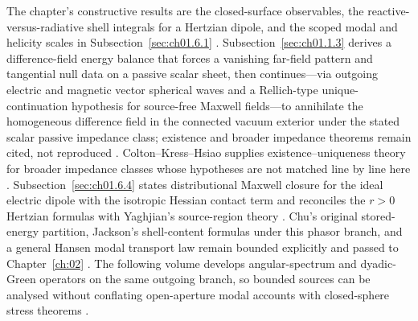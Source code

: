 The chapter's constructive results are the closed-surface observables, the reactive-versus-radiative shell integrals for a Hertzian dipole, and the scoped modal and helicity scales in Subsection~\ref{sec:ch01.6.1} \cite{stratton1941,harrington2001,chu1948}. Subsection~\ref{sec:ch01.1.3} derives a difference-field energy balance that forces a vanishing far-field pattern and tangential null data on a passive scalar sheet, then continues---via outgoing electric and magnetic vector spherical waves and a Rellich-type unique-continuation hypothesis for source-free Maxwell fields---to annihilate the homogeneous difference field in the connected vacuum exterior under the stated scalar passive impedance class; existence and broader impedance theorems remain cited, not reproduced \cite{sommerfeld1949,harrington2001}. Colton--Kress--Hsiao supplies existence--uniqueness theory for broader impedance classes whose hypotheses are not matched line by line here \cite{colton1981impedance}. Subsection~\ref{sec:ch01.6.4} states distributional Maxwell closure for the ideal electric dipole with the isotropic Hessian contact term and reconciles the $r>0$ Hertzian formulas with Yaghjian's source-region theory \cite{yaghjian1980dyadic,yaghjian1982}. Chu's original stored-energy partition, Jackson's shell-content formulas under this phasor branch, and a general Hansen modal transport law remain bounded explicitly and passed to Chapter~\ref{ch:02} \cite{jackson1999,chu1948,tai1994}. The following volume develops angular-spectrum and dyadic-Green operators on the same outgoing branch, so bounded sources can be analysed without conflating open-aperture modal accounts with closed-sphere stress theorems \cite{harrington2001}.

\label{sec:ch01.7.1}
\label{eq:ch1.continuity-admissibility}%
\label{eq:ch1.continuity-charge-continuous}%
\label{eq:ch1.master-admissibility-chain}%
\label{eq:ch1.master-charge-continuous-chain}%
\label{eq:ch1.report-class-lock}%
\label{sec:ch01.7.2}
\label{sec:ch01.7.3}
\label{eq:ch1.bridge-compatibility-criteria}%
\label{eq:ch1.compatibility-criteria}%

